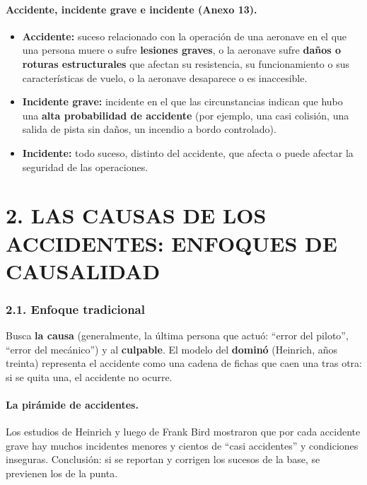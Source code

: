 \paragraph*{Accidente, incidente grave e incidente (Anexo 13).}
\begin{itemize}
  \item \textbf{Accidente:} suceso relacionado con la operación de una aeronave en el que una
        persona muere o sufre \textbf{lesiones graves}, o la aeronave sufre \textbf{daños o roturas
        estructurales} que afectan su resistencia, su funcionamiento o sus características de
        vuelo, o la aeronave desaparece o es inaccesible.
  \item \textbf{Incidente grave:} incidente en el que las circunstancias indican que hubo una
        \textbf{alta probabilidad de accidente} (por ejemplo, una casi colisión, una salida de pista
        sin daños, un incendio a bordo controlado).
  \item \textbf{Incidente:} todo suceso, distinto del accidente, que afecta o puede afectar la
        seguridad de las operaciones.
\end{itemize}

\section*{2. LAS CAUSAS DE LOS ACCIDENTES: ENFOQUES DE CAUSALIDAD}

\subsubsection*{2.1. Enfoque tradicional}
Busca \textbf{la causa} (generalmente, la última persona que actuó: ``error del piloto'', ``error
del mecánico'') y al \textbf{culpable}. El modelo del \textbf{dominó} (Heinrich, años treinta)
representa el accidente como una cadena de fichas que caen una tras otra: si se quita una, el
accidente no ocurre.

\paragraph*{La pirámide de accidentes.} Los estudios de Heinrich y luego de Frank Bird mostraron
que por cada accidente grave hay muchos incidentes menores y cientos de ``casi accidentes'' y
condiciones inseguras. Conclusión: si se reportan y corrigen los sucesos de la base, se previenen
los de la punta.

